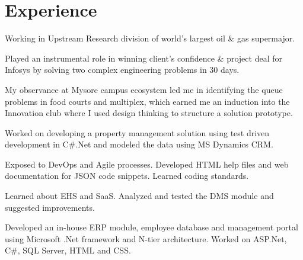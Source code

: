 \documentclass[]{deedy-resume-openfont}
\begin{document}
\begin{minipage}[t]{0.66\textwidth} 


\section{Experience}
\vspace{\topsep} %
\begin{tightemize}
\item Working in Upstream Research division of world's largest oil \& gas supermajor.
\item Played an instrumental role in winning client's confidence \& project deal for Infosys by solving two complex engineering problems in 30 days.
\item My observance at Mysore campus ecosystem led me in identifying the queue problems in food courts and multiplex, which earned me an induction into the Innovation club where I used design thinking to structure a solution prototype.
\end{tightemize}
\sectionsep

\begin{tightemize}
\item Worked on developing a property management solution using test driven development in C\#.Net and modeled the data using MS Dynamics CRM.
\end{tightemize}
\sectionsep

\begin{tightemize}
\item Exposed to DevOps and Agile processes. Developed HTML help files and web documentation for JSON code snippets. Learned coding standards.
\end{tightemize}
\sectionsep

\begin{tightemize}
\item Learned about EHS and SaaS. Analyzed and tested the DMS module and suggested improvements. \item Developed an in-house ERP module, employee database and management portal using Microsoft .Net framework and N-tier architecture. Worked on ASP.Net, C\#, SQL Server, HTML and CSS.
\end{tightemize}
\sectionsep


\end{minipage}
\end{document}
